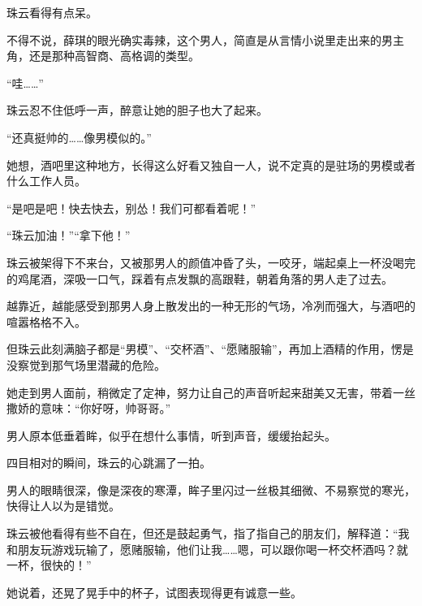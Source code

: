 \documentclass[12pt,a4paper]{article}
\begin{document}
珠云看得有点呆。



不得不说，薛琪的眼光确实毒辣，这个男人，简直是从言情小说里走出来的男主角，还是那种高智商、高格调的类型。



“哇……”



珠云忍不住低呼一声，醉意让她的胆子也大了起来。



“还真挺帅的……像男模似的。”



她想，酒吧里这种地方，长得这么好看又独自一人，说不定真的是驻场的男模或者什么工作人员。



“是吧是吧！快去快去，别怂！我们可都看着呢！”



“珠云加油！”“拿下他！”



珠云被架得下不来台，又被那男人的颜值冲昏了头，一咬牙，端起桌上一杯没喝完的鸡尾酒，深吸一口气，踩着有点发飘的高跟鞋，朝着角落的男人走了过去。



越靠近，越能感受到那男人身上散发出的一种无形的气场，冷冽而强大，与酒吧的喧嚣格格不入。



但珠云此刻满脑子都是“男模”、“交杯酒”、“愿赌服输”，再加上酒精的作用，愣是没察觉到那气场里潜藏的危险。



她走到男人面前，稍微定了定神，努力让自己的声音听起来甜美又无害，带着一丝撒娇的意味：“你好呀，帅哥哥。”



男人原本低垂着眸，似乎在想什么事情，听到声音，缓缓抬起头。



四目相对的瞬间，珠云的心跳漏了一拍。



男人的眼睛很深，像是深夜的寒潭，眸子里闪过一丝极其细微、不易察觉的寒光，快得让人以为是错觉。



珠云被他看得有些不自在，但还是鼓起勇气，指了指自己的朋友们，解释道：“我和朋友玩游戏玩输了，愿赌服输，他们让我……嗯，可以跟你喝一杯交杯酒吗？就一杯，很快的！”



她说着，还晃了晃手中的杯子，试图表现得更有诚意一些。
\end{document}
